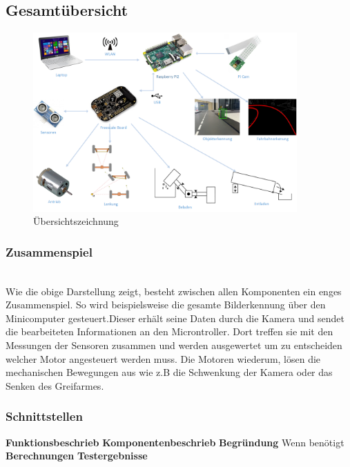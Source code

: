 \subsection{Gesamtübersicht}

\begin{figure}[h!]%
\centering
\includegraphics[width=0.9\textwidth]{03_Loesungskonzept/pictures/uebersichtszeichnung.png}
\caption{Übersichtszeichnung}
\label{fig:Java}
\end{figure}

\subsubsection{Zusammenspiel}\\[0.2cm]
Wie die obige Darstellung zeigt, besteht zwischen allen Komponenten ein enges Zusammenspiel.
So wird beispielsweise die gesamte Bilderkennung über den Minicomputer gesteuert.Dieser erhält seine Daten durch die Kamera und sendet die bearbeiteten Informationen an den Microntroller. Dort treffen sie mit den Messungen der Sensoren zusammen und werden ausgewertet um zu entscheiden welcher Motor angesteuert werden muss. Die Motoren wiederum, lösen die mechanischen Bewegungen aus wie z.B die Schwenkung der Kamera oder das Senken des Greifarmes.
\subsubsection{Schnittstellen}
\textbf{Funktionsbeschrieb}
\textbf{Komponentenbeschrieb}
\textbf{Begründung}
Wenn benötigt
\textbf{Berechnungen}
\textbf{Testergebnisse}